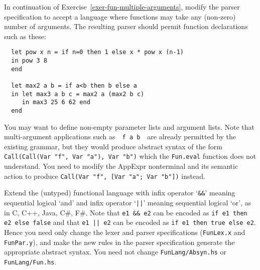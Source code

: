 \documentclass[a4paper]{article}
\begin{document}
\begin{exercise}\label{exer-fun-multiple-arguments-parse}
  In continuation of Exercise~\ref{exer-fun-multiple-arguments},
  modify the parser specification to accept a language where functions
  may take any (non-zero) number of arguments.  The resulting parser
  should permit function declarations such as these:

{\codesetup\begin{verbatim}
  let pow x n = if n=0 then 1 else x * pow x (n-1) 
  in pow 3 8 
  end

  let max2 a b = if a<b then b else a
  in let max3 a b c = max2 a (max2 b c)
     in max3 25 6 62 end
  end
\end{verbatim}}


\noindent 
You may want to define non-empty parameter lists and argument lists.  Note that multi-argument applications such as\ \ 
\texttt{f a b}\ \ are already permitted by the existing grammar, but
they would produce abstract syntax of the form \texttt{Call(Call(Var
  "f", Var "a"), Var "b")} which the \texttt{Fun.eval} function does
not understand.  You need to modify the AppExpr nonterminal and its
semantic action to produce \texttt{Call(Var "f", [Var "a"; Var "b"])}
instead.\\


\end{exercise}


\begin{exercise}\label{exer-fun-sequential-logical}
  Extend the (untyped) functional language with infix operator
  `\verb|&&|' meaning sequential logical `and' and infix operator
  `\verb+||+' meaning sequential logical `or', as in C, C++, Java,
  C\#, F\#\@.  Note that \verb+e1 && e2+ can be encoded as \texttt{if
    e1 then e2 else false} and that \verb+e1 || e2+ can be encoded as
  \texttt{if e1 then true else e2}.  Hence you need only change the
  lexer and parser specifications (\texttt{FunLex.x} and \texttt{FunPar.y}), and make the new rules in the
  parser specification generate the appropriate abstract syntax.  You
  need not change \texttt{FunLang/Absyn.hs} or \texttt{FunLang/Fun.hs}\@.\\
  


\end{exercise}
\end{document}
